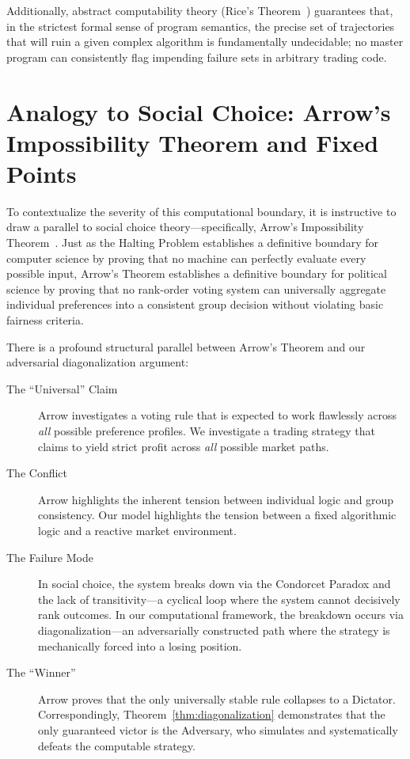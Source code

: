 \documentclass[aps,pra,reprint,superscriptaddress,amsmath,amssymb]{revtex4-2}
\theoremstyle{plain}
\theoremstyle{definition}
\theoremstyle{remark}
\begin{document}
Additionally, abstract computability theory (Rice's Theorem~\cite{Rice-1953}) guarantees that, in the strictest formal sense of program semantics, the precise set of trajectories that will ruin a given complex algorithm is fundamentally undecidable; no master program can consistently flag impending failure sets in arbitrary trading code.




\section{Analogy to Social Choice: Arrow's Impossibility Theorem and Fixed Points}

To contextualize the severity of this computational boundary, it is instructive to draw a parallel to social choice theory---specifically, Arrow's Impossibility Theorem~\cite{Arrow1963}. Just as the Halting Problem establishes a definitive boundary for computer science by proving that no machine can perfectly evaluate every possible input, Arrow's Theorem establishes a definitive boundary for political science by proving that no rank-order voting system can universally aggregate individual preferences into a consistent group decision without violating basic fairness criteria.

There is a profound structural parallel between Arrow's Theorem and our adversarial diagonalization argument:
\begin{description}
  \item[The ``Universal'' Claim] Arrow investigates a voting rule that is expected to work flawlessly across \emph{all} possible preference profiles. We investigate a trading strategy that claims to yield strict profit across \emph{all} possible market paths.
  \item[The Conflict] Arrow highlights the inherent tension between individual logic and group consistency. Our model highlights the tension between a fixed algorithmic logic and a reactive market environment.
  \item[The Failure Mode] In social choice, the system breaks down via the Condorcet Paradox and the lack of transitivity---a cyclical loop where the system cannot decisively rank outcomes. In our computational framework, the breakdown occurs via diagonalization---an adversarially constructed path where the strategy is mechanically forced into a losing position.
  \item[The ``Winner''] Arrow proves that the only universally stable rule collapses to a Dictator. Correspondingly, Theorem~\ref{thm:diagonalization} demonstrates that the only guaranteed victor is the Adversary, who simulates and systematically defeats the computable strategy.
\end{description}
\end{document}

